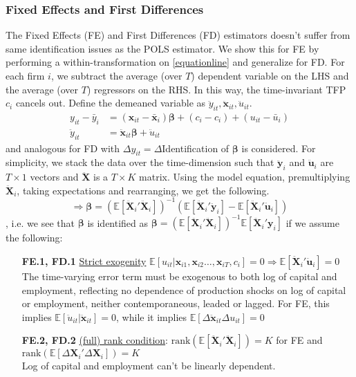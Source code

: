 \subsubsection*{Fixed Effects and First Differences}
The Fixed Effects (FE) and First Differences (FD) estimators doesn't suffer from same identification issues as the POLS estimator. We show this for FE by performing a within-transformation on \eqref{equationline} and generalize for FD. For each firm $i$, we subtract the average (over $T$) dependent variable  on the LHS and the average (over $T$) regressors on the RHS. In this way, the time-invariant TFP $c_i$ cancels out. Define the demeaned variable as $ \ddot{y}_{it}, \pmb{\ddot{x}}_{it}, \ddot{u}_{it}$.
\begin{align*}
    y_{it}-\bar{y}_{i} &=(\pmb{x}_{it}-\bar{\pmb{x}}_{i}) \pmb{\beta}+(c_i-c_i)+(u_{it} - \bar{u}_{i}) \\
    \ddot{y}_{it} &=  \ddot{\pmb{x}}_{it} \pmb{\beta}+\ddot{u}_{it}
\end{align*}
and analogous for FD with $\Delta y_{it}=\Delta\textbf{}$Identification of $\pmb{\beta}$ is considered. For simplicity, we stack the data over the time-dimension such that $\ddot{\pmb{y}}_{i}$ and $\ddot{\pmb{u}}_{i}$ are $T \times 1$ vectors and $\pmb{\ddot{X}}$ is a $T\times K$ matrix. Using the model equation, premultiplying $\pmb{\ddot{X}}_{i}$, taking expectations and rearranging, we get the following.
$$ \Rightarrow  \pmb{\beta} = (\mathbb{E}[\pmb{\ddot{X}}_{i}'\pmb{\ddot{X}}_{i}])^{-1} \left(  \mathbb{E}[\pmb{\ddot{X}}_{i}'\pmb{\ddot{y}}_{i}]-\mathbb{E}[\pmb{\ddot{X}}_{i}' \pmb{\ddot{u}}_{i}]\right)$$
, i.e. we see that $\pmb{\beta}$ is identified as $\pmb{\beta} = (\mathbb{E}[\pmb{\ddot{X}}_{i}'\pmb{\ddot{X}}_{i}])^{-1} \mathbb{E}[\pmb{\ddot{X}}_{i}'\pmb{y}_{i}]$ if we assume the following:
\begin{enumerate}
    \item[\textbf{FE.1, FD.1}] \underline{Strict exogenity} $\mathbb{E}[u_{it}\vert \pmb{x}_{i1},\pmb{x}_{i2}\dots,\pmb{x}_{iT},c_i]=0\Rightarrow \mathbb{E}[\pmb{\ddot{X}}_{i}' \pmb{\ddot{u}}_{i}]=0$ \\
    The time-varying error term must be exogenous to both log of capital and employment, reflecting no dependence of production shocks on log of capital or employment, neither contemporaneous, leaded or lagged. For FE, this implies $\mathbb{E}[ \ddot{u}_{it} \vert\pmb{\ddot{x}}_{it}]=0$, while it implies $\mathbb{E}[\Delta \pmb{\ddot{x}}_{it} \Delta u_{it}]=0$
    \item[\textbf{FE.2, FD.2}] \underline{ (full) rank condition}: $\text{rank}(\mathbb{E}[\pmb{\ddot{X}}_{i}'\pmb{\ddot{X}}_{i}])=K$ for FE and $\text{rank}(\mathbb{E}[\Delta\pmb{X}_{i}' \Delta\pmb{X}_{i}])=K$ \\
    Log of capital and employment can't be linearly dependent.
\end{enumerate}

